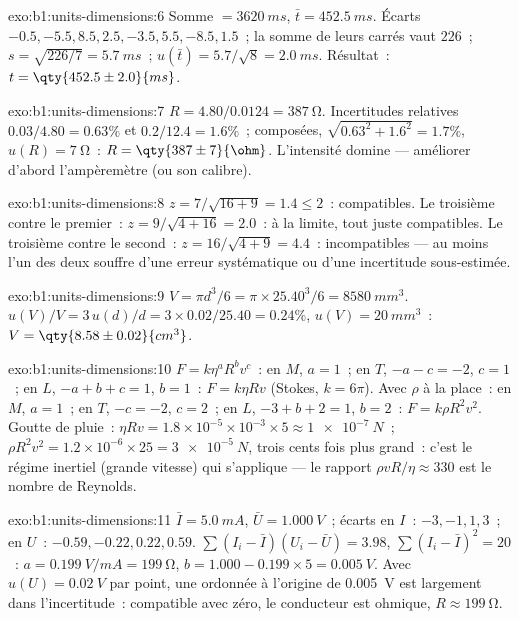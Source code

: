 \begin{solution}{exo:b1:units-dimensions:6}
Somme $= \qty{3620}{ms}$, $\bar t = \qty{452.5}{ms}$. Écarts
$-0.5, -5.5, 8.5, 2.5, -3.5, 5.5, -8.5, 1.5$~; la somme de leurs carrés vaut $226$~;
$s = \sqrt{226/7} = \qty{5.7}{ms}$~; $u(\bar t) = 5.7/\sqrt8 = \qty{2.0}{ms}$.
Résultat~: $t = \qty{452.5\pm2.0}{ms}$.
\end{solution}

\begin{solution}{exo:b1:units-dimensions:7}
$R = 4.80/0.0124 = \qty{387}{\ohm}$. Incertitudes relatives $0.03/4.80 =
0.63\%$ et $0.2/12.4 = 1.6\%$~; composées, $\sqrt{0.63^2 + 1.6^2} = 1.7\%$,
$u(R) = \qty{7}{\ohm}$~: $R = \qty{387\pm7}{\ohm}$. L'intensité domine
--- améliorer d'abord l'ampèremètre (ou son calibre).
\end{solution}

\begin{solution}{exo:b1:units-dimensions:8}
$z = 7/\sqrt{16 + 9} = 1.4 \leq 2$~: compatibles.
Le troisième contre le premier~: $z = 9/\sqrt{4 + 16} = 2.0$~: à la
limite, tout juste compatibles. Le troisième contre le second~:
$z = 16/\sqrt{4 + 9} = 4.4$~: incompatibles --- au moins l'un des deux
souffre d'une erreur systématique ou d'une incertitude sous-estimée.
\end{solution}

\begin{solution}{exo:b1:units-dimensions:9}
$V = \pi d^3/6 = \pi \times 25.40^3/6 = \qty{8580}{mm^3}$.
$u(V)/V = 3\,u(d)/d = 3 \times 0.02/25.40 = 0.24\%$,
$u(V) = \qty{20}{mm^3}$~: $V = \qty{8.58\pm0.02}{cm^3}$.
\end{solution}

\begin{solution}{exo:b1:units-dimensions:10}
$F = k\eta^a R^b v^c$~: en $M$, $a = 1$~; en $T$, $-a - c = -2$, $c = 1$~;
en $L$, $-a + b + c = 1$, $b = 1$~: $F = k\eta R v$ (Stokes, $k = 6\pi$).
Avec $\rho$ à la place~: en $M$, $a = 1$~; en $T$, $-c = -2$, $c = 2$~; en $L$,
$-3 + b + 2 = 1$, $b = 2$~: $F = k\rho R^2 v^2$.
Goutte de pluie~: $\eta R v = 1.8\times10^{-5} \times 10^{-3} \times 5 \approx
\qty{1e-7}{N}$~; $\rho R^2 v^2 = 1.2 \times 10^{-6} \times 25 =
\qty{3e-5}{N}$, trois cents fois plus grand~: c'est le régime inertiel
(grande vitesse) qui s'applique --- le rapport $\rho v R/\eta \approx 330$
est le nombre de Reynolds.
\end{solution}

\begin{solution}{exo:b1:units-dimensions:11}
$\bar I = \qty{5.0}{mA}$, $\bar U = \qty{1.000}{V}$~; écarts en $I$~:
$-3, -1, 1, 3$~; en $U$~: $-0.59, -0.22, 0.22, 0.59$.
$\sum (I_i - \bar I)(U_i - \bar U) = 3.98$, $\sum (I_i - \bar I)^2 = 20$~:
$a = \qty{0.199}{V/mA} = \qty{199}{\ohm}$, $b = 1.000 - 0.199 \times 5 =
\qty{0.005}{V}$. Avec $u(U) = \qty{0.02}{V}$ par point, une ordonnée à
l'origine de \qty{0.005}{V} est largement dans l'incertitude~:
compatible avec zéro, le conducteur est ohmique, $R \approx \qty{199}{\ohm}$.
\end{solution}

